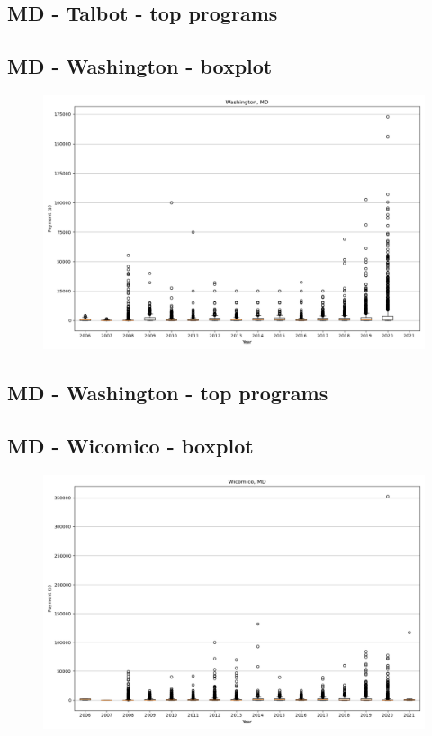 \subsection*{MD - Talbot - top programs}

\newpage
\subsection*{MD - Washington - boxplot}
\begin{figure}[h]
\centering
\includegraphics[width=7in]{../output/boxplots/counties/Washington-MD_boxplot.png}
\end{figure}


\subsection*{MD - Washington - top programs}

\newpage
\subsection*{MD - Wicomico - boxplot}
\begin{figure}[h]
\centering
\includegraphics[width=7in]{../output/boxplots/counties/Wicomico-MD_boxplot.png}
\end{figure}



